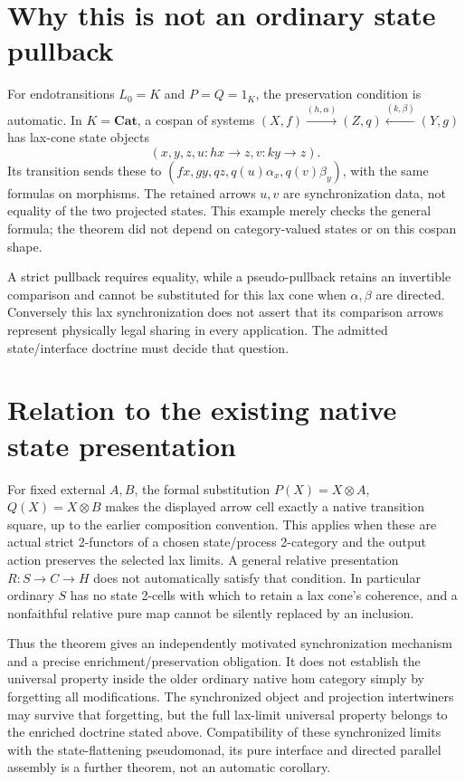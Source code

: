 \documentclass{article}
\begin{document}
\section{Why this is not an ordinary state pullback}
For endotransitions $L_0=K$ and $P=Q=1_K$, the preservation condition is automatic. In $K=\mathbf{Cat}$, a cospan of systems $(X,f)\xrightarrow{(h,\alpha)}(Z,q)\xleftarrow{(k,\beta)}(Y,g)$ has lax-cone state objects
\[
(x,y,z,u:hx\to z,v:ky\to z).
\]
Its transition sends these to $(fx,gy,qz,q(u)\alpha_x,q(v)\beta_y)$, with the same formulas on morphisms. The retained arrows $u,v$ are synchronization data, not equality of the two projected states. This example merely checks the general formula; the theorem did not depend on category-valued states or on this cospan shape.

A strict pullback requires equality, while a pseudo-pullback retains an invertible comparison and cannot be substituted for this lax cone when $\alpha,\beta$ are directed. Conversely this lax synchronization does not assert that its comparison arrows represent physically legal sharing in every application. The admitted state/interface doctrine must decide that question.

\section{Relation to the existing native state presentation}
For fixed external $A,B$, the formal substitution $P(X)=X\otimes A$, $Q(X)=X\otimes B$ makes the displayed arrow cell exactly a native transition square, up to the earlier composition convention. This applies when these are actual strict 2-functors of a chosen state/process 2-category and the output action preserves the selected lax limits. A general relative presentation $R:S\to C\to H$ does not automatically satisfy that condition. In particular ordinary $S$ has no state 2-cells with which to retain a lax cone's coherence, and a nonfaithful relative pure map cannot be silently replaced by an inclusion.

Thus the theorem gives an independently motivated synchronization mechanism and a precise enrichment/preservation obligation. It does not establish the universal property inside the older ordinary native hom category simply by forgetting all modifications. The synchronized object and projection intertwiners may survive that forgetting, but the full lax-limit universal property belongs to the enriched doctrine stated above. Compatibility of these synchronized limits with the state-flattening pseudomonad, its pure interface and directed parallel assembly is a further theorem, not an automatic corollary.
\end{document}
